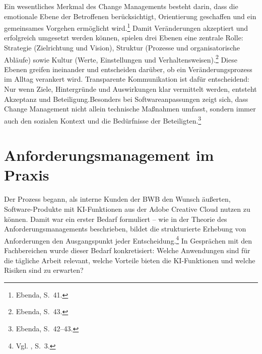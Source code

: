 \documentclass[
    12pt, 
    a4paper,
    ]{scrartcl} %
\begin{document}
Ein wesentliches Merkmal des Change Managements besteht darin, dass die emotionale Ebene der Betroffenen berücksichtigt, Orientierung geschaffen und ein gemeinsames Vorgehen ermöglicht wird.\footnote{Ebenda, S.~41.} Damit Veränderungen akzeptiert und erfolgreich umgesetzt werden können, spielen drei Ebenen eine zentrale Rolle: Strategie (Zielrichtung und Vision), Struktur (Prozesse und organisatorische Abläufe) sowie Kultur (Werte, Einstellungen und Verhaltensweisen).\footnote{Ebenda, S.~43.} Diese Ebenen greifen ineinander und entscheiden darüber, ob ein Veränderungsprozess im Alltag verankert wird.
Transparente Kommunikation ist dafür entscheidend: Nur wenn Ziele, Hintergründe und Auswirkungen klar vermittelt werden, entsteht Akzeptanz und Beteiligung.Besonders bei Softwareanpassungen zeigt sich, dass Change Management nicht allein technische Maßnahmen umfasst, sondern immer auch den sozialen Kontext und die Bedürfnisse der Beteiligten.\footnote{Ebenda, S.~42--43.}

\section{Anforderungsmanagement im Praxis}
Der Prozess begann, als interne Kunden der BWB den Wunsch äußerten, Software-Produkte mit KI-Funktionen aus der Adobe Creative Cloud nutzen zu können. Damit war ein erster Bedarf formuliert – wie in der Theorie des Anforderungsmanagements beschrieben, bildet die strukturierte Erhebung von Anforderungen den Ausgangspunkt jeder Entscheidung.\footnote{Vgl. \cite{S_PohlRupp}, S.~3.} In Gesprächen mit den Fachbereichen wurde dieser Bedarf konkretisiert: Welche Anwendungen sind für die tägliche Arbeit relevant, welche Vorteile bieten die KI-Funktionen und welche Risiken sind zu erwarten?
\end{document}
